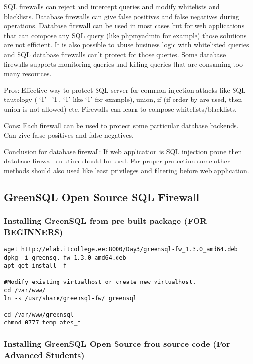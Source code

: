 SQL firewalls can reject and intercept queries and modify whitelists and blacklists. Database firewalls can give false positives and false negatives during operations. Database firewall can be used in most cases but for web applications that can compose any SQL query (like  phpmyadmin for example) those solutions are not efficient. It is also possible to abuse business logic with whitelisted queries and SQL database firewalls can’t protect for those queries.
Some database firewalls supports monitoring queries and killing queries that are consuming too many resources.

Pros:
Effective way to protect SQL server for common injection attacks like SQL tautology ( ‘1’=’1’, ‘1’ like ‘1’ for example), union, if (if order by are used, then union is not allowed) etc.
Firewalls can learn to compose whitelists/blacklists.

Cons:
Each firewall can be used to protect some particular database backends.
Can give false positives and false negatives.

Conclusion for  database firewall:
If web application is SQL injection prone then database firewall solution should be used.
For proper protection some other methods should also used like least privileges and filtering before web application.

\subsection{GreenSQL Open Source SQL Firewall}
\subsubsection{Installing GreenSQL from pre built package (FOR BEGINNERS)}
\begin{verbatim}
wget http://elab.itcollege.ee:8000/Day3/greensql-fw_1.3.0_amd64.deb
dpkg -i greensql-fw_1.3.0_amd64.deb
apt-get install -f

#Modify existing virtualhost or create new virtualhost.
cd /var/www/
ln -s /usr/share/greensql-fw/ greensql

cd /var/www/greensql
chmod 0777 templates_c
\end{verbatim}

\subsubsection{Installing GreenSQL Open Source frou source code (For Advanced Students)}


